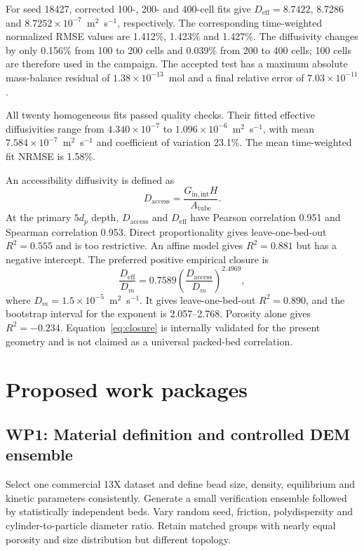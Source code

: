 \documentclass[12pt,a4paper]{article}
\begin{document}
For seed 18427, corrected 100-, 200- and 400-cell fits give
$D_{\mathrm{eff}}=8.7422$, 8.7286 and $8.7252\times10^{-7}$~m$^2$~s$^{-1}$,
respectively. The corresponding time-weighted normalized RMSE values are
1.412\%, 1.423\% and 1.427\%. The diffusivity changes by only 0.156\% from 100
to 200 cells and 0.039\% from 200 to 400 cells; 100 cells are therefore used in
the campaign. The accepted test has a maximum absolute mass-balance residual
of $1.38\times10^{-13}$~mol and a final relative error of
$7.03\times10^{-11}$.

All twenty homogeneous fits passed quality checks. Their fitted effective
diffusivities range from $4.340\times10^{-7}$ to
$1.096\times10^{-6}$~m$^2$~s$^{-1}$, with mean
$7.584\times10^{-7}$~m$^2$~s$^{-1}$ and coefficient of variation 23.1\%.
The mean time-weighted fit NRMSE is 1.58\%.

An accessibility diffusivity is defined as
\begin{equation}
 D_{\mathrm{access}}=\frac{G_{\mathrm{in,int}}H}{A_{\mathrm{tube}}}.
 \label{eq:daccess}
\end{equation}
At the primary $5d_p$ depth, $D_{\mathrm{access}}$ and $D_{\mathrm{eff}}$
have Pearson correlation 0.951 and Spearman correlation 0.953. Direct
proportionality gives leave-one-bed-out $R^2=0.555$ and is too restrictive.
An affine model gives $R^2=0.881$ but has a negative intercept. The preferred
positive empirical closure is
\begin{equation}
 \frac{D_{\mathrm{eff}}}{D_m}=0.7589
 \left(\frac{D_{\mathrm{access}}}{D_m}\right)^{2.4969},
 \label{eq:closure}
\end{equation}
where $D_m=1.5\times10^{-5}$~m$^2$~s$^{-1}$. It gives
leave-one-bed-out $R^2=0.890$, and the bootstrap interval for the exponent is
2.057--2.768. Porosity alone gives $R^2=-0.234$. Equation~\eqref{eq:closure}
is internally validated for the present geometry and is not claimed as a
universal packed-bed correlation.

\section{Proposed work packages}

\subsection*{WP1: Material definition and controlled DEM ensemble}

Select one commercial 13X dataset and define bead size, density, equilibrium
and kinetic parameters consistently. Generate a small verification ensemble
followed by statistically independent beds. Vary random seed, friction,
polydispersity and cylinder-to-particle diameter ratio. Retain matched groups
with nearly equal porosity and size distribution but different topology.
\end{document}
